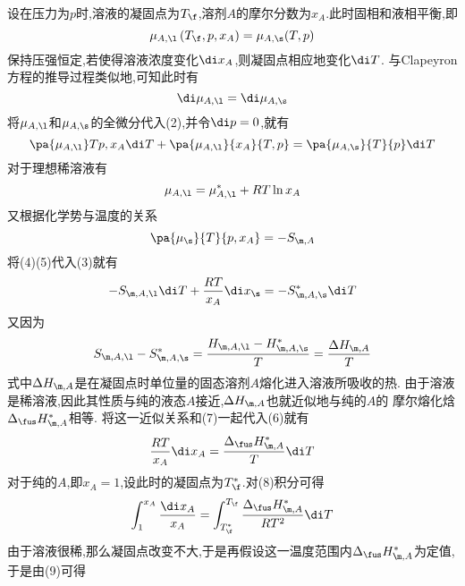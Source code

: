\documentclass{ctexart}
\begin{document}
\begin{derivation}\setcounter{equation}{0}
    设在压力为$p$时,溶液的凝固点为$T_\f$,溶剂$A$的摩尔分数为$x_A$.此时固相和液相平衡,即
    \begin{equation}
        \mu_{A,\l}\left(T_\f,p,x_A\right)=\mu_{A,\s}(T,p)
    \end{equation}
    保持压强恒定,若使得溶液浓度变化$\di x_A$,则凝固点相应地变化$\di T$.%
    与Clapeyron方程的推导过程类似地,可知此时有
    \begin{equation}
        \di\mu_{A,\l}=\di\mu_{A,\s}
    \end{equation}
    将$\mu_{A,\l}$和$\mu_{A,\s}$的全微分代入(2),并令$\di p=0$,就有
    \begin{equation}\pa{\mu_{A,\l}}T{p,x_A}\di T+\pa{\mu_{A,\l}}{x_A}{T,p}=\pa{\mu_{A,\s}}{T}{p}\di T\end{equation}
    对于理想稀溶液有
    \begin{equation}\mu_{A,\l}=\mu_{A,\l}^\ast+RT\ln x_A\end{equation}
    又根据化学势与温度的关系
    \begin{equation}\pa{\mu_{\s}}{T}{p,x_A}=-S_{\m,A}\end{equation}
    将(4)(5)代入(3)就有
    \begin{equation}
        -S_{\m,A,\l}\di T+\dfrac{RT}{x_A}\di x_\s=-S_{\m,A,\s}^\ast\di T
    \end{equation}
    又因为
    \begin{equation}
        S_{\m,A,\l}-S_{\m,A,\s}^\ast
        =\dfrac{H_{\m,A,\l}-H_{\m,A,\s}^\ast}{T}
        =\dfrac{\Delta H_{\m,A}}{T}
    \end{equation}
    式中$\Delta H_{\m,A}$是在凝固点时单位量的固态溶剂$A$熔化进入溶液所吸收的热.%
    由于溶液是稀溶液,因此其性质与纯的液态$A$接近,$\Delta H_{\m,A}$也就近似地与纯的$A$的%
    摩尔熔化焓$\Delta_{\fus}H_{\m,A}^\ast$相等.%
    将这一近似关系和(7)一起代入(6)就有
    \begin{equation}\dfrac{RT}{x_A}\di x_A=\dfrac{\Delta_{\fus}H_{\m,A}^\ast}{T}\di T\end{equation}
    对于纯的$A$,即$x_A=1$,设此时的凝固点为$T_\f^\ast$.对(8)积分可得
    \begin{equation}\int_{1}^{x_A}\dfrac{\di x_A}{x_A}=\int_{T_\f^\ast}^{T_\f}\dfrac{\Delta_{\fus}H_{\m,A}^\ast}{RT^2}\di T\end{equation}
    由于溶液很稀,那么凝固点改变不大,于是再假设这一温度范围内$\Delta_{\fus}H_{\m,A}^\ast$为定值,于是由(9)可得
    \begin{equation}

\end{equation}
\end{derivation}
\end{document}
